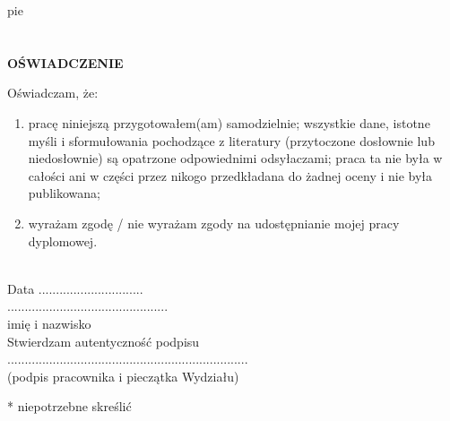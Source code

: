 pie\documentclass[12pt,a4paper,twoside,openright]{report}
\author{Karol Zygadło}
\begin{document}
    \begin{titlepage}
    
    \end{titlepage}
\begingroup
    \tableofcontents
    
    
    
    
    
    
    
    
\endgroup

\medskip
\printbibliography[type=online, title={Netografia\footnote{Podane adresy zostały odwiedzone w maju 2020 roku. Nie ma gwarancji, że po tej dacie będą dalej aktywne lub poprawne.}}]
\printbibliography[type=book, title={Bibliografia}]
\lstlistoflistings
\listoffigures
\listoftables

\newpage

\chapter*{}
\centering\textbf{OŚWIADCZENIE\\[6mm]}
\raggedright
Oświadczam, że: 
\begin{enumerate}
    \item pracę niniejszą przygotowałem(am) samodzielnie; wszystkie dane, istotne myśli i sformułowania pochodzące 
z literatury (przytoczone dosłownie lub niedosłownie) są opatrzone odpowiednimi odsyłaczami; praca ta nie była 
w całości ani w części przez nikogo przedkładana do żadnej oceny i nie była publikowana;
    \item wyrażam zgodę / nie wyrażam zgody na udostępnianie mojej pracy dyplomowej. 
\end{enumerate}\\[10mm]
Data ..............................\\[15mm]


\centering
\hspace{200pt} ..............................................\\[0mm]
\hspace{200pt} imię i nazwisko\\[10mm]
\hspace{200pt} Stwierdzam autentyczność podpisu\\[5mm]
\hspace{200pt} .....................................................................\\[0mm]
\hspace{200pt} (podpis  pracownika i pieczątka Wydziału)\\[20mm]
 
 \raggedright
 * niepotrzebne skreślić
\end{document}
